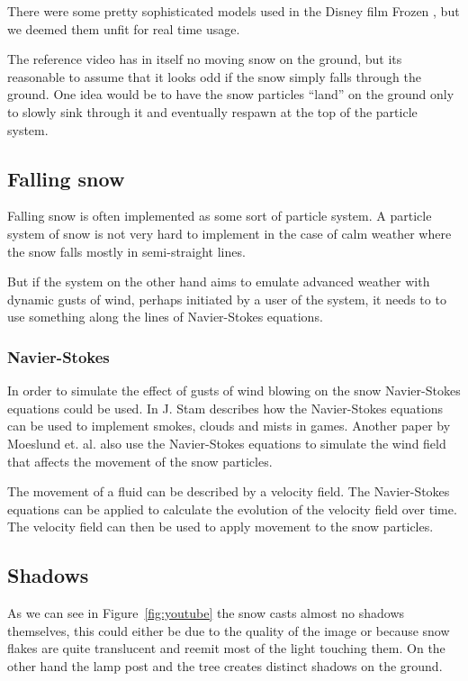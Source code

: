 \documentclass[a4paper,12pt]{article}
\begin{document}
There were some pretty sophisticated models used in the Disney film Frozen \cite{disney-snow}, but we deemed them unfit for real time usage.

The reference video has in itself no moving snow on the ground, but its reasonable to assume that it looks odd if the snow simply falls through the ground. One idea would be to have the snow particles ``land'' on the ground only to slowly sink through it and eventually respawn at the top of the particle system.


\subsection{Falling snow}

Falling snow is often implemented as some sort of particle system. A particle system of snow is not very hard to implement in the case of calm weather where the snow falls mostly in semi-straight lines.

But if the system on the other hand aims to emulate advanced weather with dynamic gusts of wind, perhaps initiated by a user of the system, it needs to to use something along the lines of Navier-Stokes equations.


\subsubsection{Navier-Stokes}

In order to simulate the effect of gusts of wind blowing on the snow Navier-Stokes equations could be used. In \cite{fluid-dynamics} J. Stam describes how the Navier-Stokes equations can be used to implement smokes, clouds and mists in games. Another paper \cite{modeling-falling-accumulating-snow} by Moeslund et. al. also use the Navier-Stokes equations to simulate the wind field that affects the movement of the snow particles.

The movement of a fluid can be described by a velocity field. The Navier-Stokes equations can be applied to calculate the evolution of the velocity field over time. The velocity field can then be used to apply movement to the snow particles. \cite{fluid-dynamics}



\subsection{Shadows}

As we can see in Figure~\ref{fig:youtube} the snow casts almost no shadows themselves, this could either be due to the quality of the image or because snow flakes are quite translucent and reemit most of the light touching them. On the other hand the lamp post and the tree creates distinct shadows on the ground.
\end{document}
